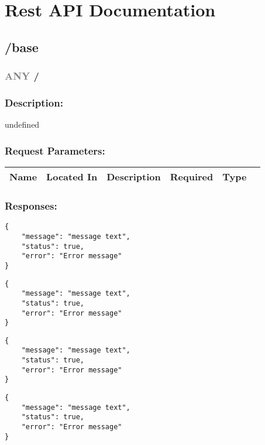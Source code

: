 \documentclass{article}
\begin{document}
 
\section{Rest API Documentation} 
\subsection*{/base}
\subsubsection*{\textcolor{Gray}{ANY} /}
\subsubsection{Description:} 
undefined
 \subsubsection{Request Parameters:} 
 
\begin{tabular}{ | l | l | l | l | l | p{5cm} |} 
 \hline 
\textbf{Name} & \textbf{Located In} & \textbf{Description} & \textbf{Required} & \textbf{Type}\\ \hline 
\end{tabular} 
 
\subsubsection{Responses:}
  
\begin{lstlisting}[frame=single, title=\textbf{500}] 
{
    "message": "message text",
    "status": true,
    "error": "Error message"
}
\end{lstlisting}
  
\begin{lstlisting}[frame=single, title=\textbf{404}] 
{
    "message": "message text",
    "status": true,
    "error": "Error message"
}
\end{lstlisting}
  
\begin{lstlisting}[frame=single, title=\textbf{403}] 
{
    "message": "message text",
    "status": true,
    "error": "Error message"
}
\end{lstlisting}
  
\begin{lstlisting}[frame=single, title=\textbf{401}] 
{
    "message": "message text",
    "status": true,
    "error": "Error message"
}
\end{lstlisting}
  
\end{document}
